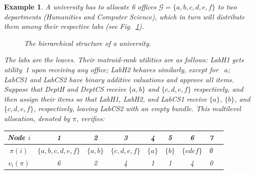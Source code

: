 \documentclass[]{article}
\newtheorem{example}{Example}
\newcommand{\items}{\mathcal{G}}
\begin{document}
\begin{example} \label{example: model}
    A university has to allocate 6 offices $\items=\{a,b,c,d,e,f\}$ to two departments (Humanities and Computer Science), which in turn will distribute them among their respective labs (see Fig.~\ref{fig:exampletree}). 

    
    \begin{figure}[hbtp]
    \centering
    \caption{The hierarchical structure of a university.}
    \label{fig:exampletree}
    \end{figure}


    \noindent The labs are the leaves. Their matroid-rank utilities are as follows: LabH1 gets utility~1 upon receiving any office; LabH2 behaves similarly, except for ~$a$; LabCS1 and LabCS2 have binary additive valuations and approve all items. 
    \noindent Suppose that DeptH and DeptCS receive $\{a,b\}$ and $\{c,d,e,f\}$ respectively, and then assign their items so that LabH1, LabH2, and LabCS1 receive  $\{a\}$, $\{b\}$, and $\{c,d,e,f\}$, respectively, leaving LabCS2 with an empty bundle. This multilevel allocation, denoted by $\pi$, verifies: 

    \begin{table}[h!]
        \centering
        \begin{tabular}{c|cccccccc}
            \hline 
            Node $i$ & 1 & 2 & 3 & 4 & 5 & 6 & 7 \\
            \hline 
            $\pi(i)$ & $\{a, b, c, d, e, f\}$ & $\{a, b\}$ & $\{c, d, e, f\}$ & $\{a\}$ & $\{b\}$ & $\{cdef\}$ & $\emptyset$ \\ \hline 
            $v_i(\pi)$ & 6 & 2 & 4 & 1 & 1 & 4 & 0 \\
            \hline 
        \end{tabular}
    \end{table}
     

\end{example}
\end{document}
